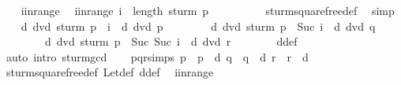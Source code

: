\begin{isabellebody}
\isanewline
\ \ \isamarkupfalse%
\ i{\isacharunderscore}in{\isacharunderscore}range\ \isamarkupfalse%
\ i{\isacharunderscore}in{\isacharunderscore}range{\isacharprime}{\isacharcolon}\ {\isachardoublequoteopen}i\ {\isacharless}\ length\ {\isacharparenleft}sturm\ p{\isacharparenright}\ {\isacharminus}\ {}{\isachardoublequoteclose}\isanewline
\ \ \ \ \ \ \isamarkupfalse%
\ sturm{\isacharunderscore}squarefree{\isacharprime}{\isacharunderscore}def\ \isamarkupfalse%
\ simp\isanewline
\ \ \isamarkupfalse%
\ {\isachardoublequoteopen}d\ dvd\ {\isacharparenleft}sturm\ p\ {\isacharbang}\ i{\isacharparenright}{\isachardoublequoteclose}\ {\isacharparenleft}\ {\isachardoublequoteopen}d\ dvd\ {\isacharquery}p{\isacharprime}{\isachardoublequoteclose}{\isacharparenright}\isanewline
\ \ \ \ \ \ \ \ {\isachardoublequoteopen}d\ dvd\ {\isacharparenleft}sturm\ p\ {\isacharbang}\ {\isacharparenleft}Suc\ i{\isacharparenright}{\isacharparenright}{\isachardoublequoteclose}\ {\isacharparenleft}\ {\isachardoublequoteopen}d\ dvd\ {\isacharquery}q{\isacharprime}{\isachardoublequoteclose}{\isacharparenright}\isanewline
\ \ \ \ \ \ \ \ {\isachardoublequoteopen}d\ dvd\ {\isacharparenleft}sturm\ p\ {\isacharbang}\ {\isacharparenleft}Suc\ {\isacharparenleft}Suc\ i{\isacharparenright}{\isacharparenright}{\isacharparenright}{\isachardoublequoteclose}\ {\isacharparenleft}\ {\isachardoublequoteopen}d\ dvd\ {\isacharquery}r{\isacharprime}{\isachardoublequoteclose}{\isacharparenright}\isanewline
\ \ \ \ \ \ \isamarkupfalse%
\ d{\isacharunderscore}def\ \isamarkupfalse%
\ {\isacharparenleft}auto\ intro{\isacharcolon}\ sturm{\isacharunderscore}gcd{\isacharparenright}\isanewline
\ \ \isamarkupfalse%
\ pqr{\isacharunderscore}simps{\isacharcolon}\ {\isachardoublequoteopen}{\isacharquery}p{\isacharprime}\ {\isacharequal}\ {\isacharquery}p\ {\isacharasterisk}\ d{\isachardoublequoteclose}\ {\isachardoublequoteopen}{\isacharquery}q{\isacharprime}\ {\isacharequal}\ {\isacharquery}q\ {\isacharasterisk}\ d{\isachardoublequoteclose}\ {\isachardoublequoteopen}{\isacharquery}r{\isacharprime}\ {\isacharequal}\ {\isacharquery}r\ {\isacharasterisk}\ d{\isachardoublequoteclose}\isanewline
\ \ \ \ \isamarkupfalse%
\ sturm{\isacharunderscore}squarefree{\isacharprime}{\isacharunderscore}def\ Let{\isacharunderscore}def\ d{\isacharunderscore}def\ \isamarkupfalse%
\ i{\isacharunderscore}in{\isacharunderscore}range{\isacharprime}\isanewline

\end{isabellebody}
